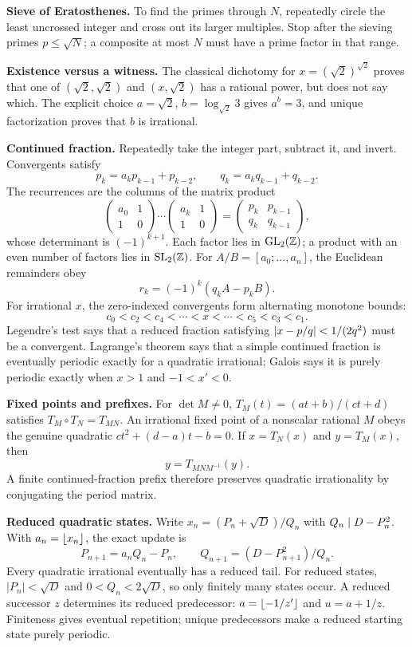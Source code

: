 \textbf{Sieve of Eratosthenes.} To find the primes through $N$, repeatedly
circle the least uncrossed integer and cross out its larger multiples. Stop
after the sieving primes $p\le\sqrt N$; a composite at most $N$ must have a
prime factor in that range.

\textbf{Existence versus a witness.} The classical dichotomy for
$x=(\sqrt2)^{\sqrt2}$ proves that one of
$(\sqrt2,\sqrt2)$ and $(x,\sqrt2)$ has a rational power, but does not say
which. The explicit choice
$a=\sqrt2$, $b=\log_{\sqrt2}3$ gives $a^b=3$, and unique factorization proves
that $b$ is irrational.

\textbf{Continued fraction.} Repeatedly take the integer part, subtract it, and invert. Convergents satisfy
\[
p_k=a_kp_{k-1}+p_{k-2},\qquad q_k=a_kq_{k-1}+q_{k-2}.
\]
The recurrences are the columns of the matrix product
\[
\begin{pmatrix}a_0&1\\1&0\end{pmatrix}\cdots
\begin{pmatrix}a_k&1\\1&0\end{pmatrix}
=\begin{pmatrix}p_k&p_{k-1}\\q_k&q_{k-1}\end{pmatrix},
\]
whose determinant is $(-1)^{k+1}$. Each factor lies in
$\operatorname{GL}_2(\mathbb Z)$; a product with an even number of factors lies in
$\operatorname{SL}_2(\mathbb Z)$.
For $A/B=[a_0;\dots,a_n]$, the Euclidean remainders obey
\[
r_k=(-1)^k(q_kA-p_kB).
\]
For irrational $x$, the zero-indexed convergents form alternating monotone bounds:
\[
c_0<c_2<c_4<\cdots<x<\cdots<c_5<c_3<c_1.
\]
Legendre's test says that a reduced fraction satisfying
$\left|x-p/q\right|<1/(2q^2)$ must be a convergent. Lagrange's theorem says that a
simple continued fraction is eventually periodic exactly for a quadratic
irrational; Galois says it is purely periodic exactly when $x>1$ and
$-1<x'<0$.

\textbf{Fixed points and prefixes.} For $\det M\ne0$,
$T_M(t)=(at+b)/(ct+d)$ satisfies $T_M\circ T_N=T_{MN}$.
An irrational fixed point of a nonscalar rational $M$ obeys the genuine
quadratic $ct^2+(d-a)t-b=0$. If $x=T_N(x)$ and $y=T_M(x)$, then
\[
 y=T_{MNM^{-1}}(y).
\]
A finite continued-fraction prefix therefore preserves quadratic
irrationality by conjugating the period matrix.

\textbf{Reduced quadratic states.} Write $x_n=(P_n+\sqrt D)/Q_n$ with
$Q_n\mid D-P_n^2$. With $a_n=\left\lfloor x_n\right\rfloor$, the exact update is
\[
 P_{n+1}=a_nQ_n-P_n,\qquad Q_{n+1}=(D-P_{n+1}^2)/Q_n.
\]
Every quadratic irrational eventually has a reduced tail.
For reduced states, $|P_n|<\sqrt D$ and $0<Q_n<2\sqrt D$,
so only finitely many states occur. A reduced successor $z$ determines
its reduced predecessor:
$a=\left\lfloor -1/z'\right\rfloor$ and $u=a+1/z$.
Finiteness gives eventual repetition; unique predecessors make a
reduced starting state purely periodic.

